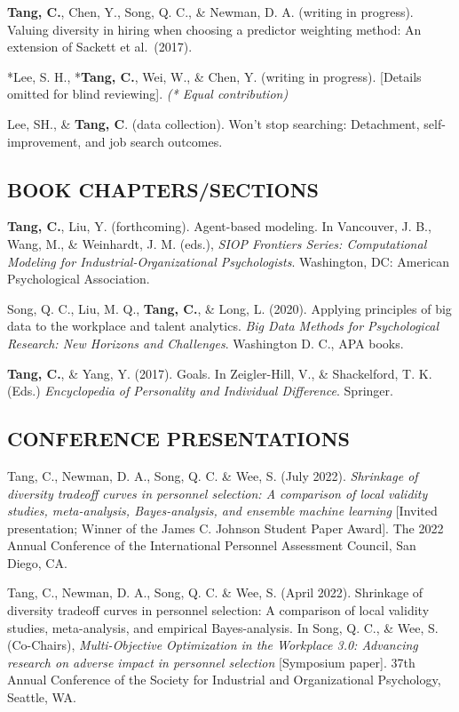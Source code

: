 \documentclass[
  20,
]{article}
\begin{document}
\textbf{Tang, C.}, Chen, Y., Song, Q. C., \& Newman, D. A. (writing in
progress). Valuing diversity in hiring when choosing a predictor
weighting method: An extension of Sackett et al.~(2017).

*Lee, S. H., *\textbf{Tang, C.}, Wei, W., \& Chen, Y. (writing in
progress). {[}Details omitted for blind reviewing{]}. \emph{(* Equal
contribution)}

Lee, SH., \& \textbf{Tang, C}. (data collection). Won't stop searching:
Detachment, self-improvement, and job search outcomes.

\hypertarget{book-chapterssections}{%
\subsection{\texorpdfstring{\textbf{BOOK
CHAPTERS/SECTIONS}}{BOOK CHAPTERS/SECTIONS}}\label{book-chapterssections}}

\textbf{Tang, C.}, Liu, Y. (forthcoming). Agent-based modeling. In
Vancouver, J. B., Wang, M., \& Weinhardt, J. M. (eds.), \emph{SIOP
Frontiers Series: Computational Modeling for Industrial-Organizational
Psychologists}. Washington, DC: American Psychological Association.

Song, Q. C., Liu, M. Q., \textbf{Tang, C.}, \& Long, L. (2020). Applying
principles of big data to the workplace and talent analytics. \emph{Big
Data Methods for Psychological Research: New Horizons and Challenges}.
Washington D. C., APA books.

\textbf{Tang, C.}, \& Yang, Y. (2017). Goals. In Zeigler-Hill, V., \&
Shackelford, T. K. (Eds.) \emph{Encyclopedia of Personality and
Individual Difference}. Springer.

\hypertarget{conference-presentations}{%
\subsection{\texorpdfstring{\textbf{CONFERENCE
PRESENTATIONS}}{CONFERENCE PRESENTATIONS}}\label{conference-presentations}}

Tang, C., Newman, D. A., Song, Q. C. \& Wee, S. (July 2022).
\emph{Shrinkage of diversity tradeoff curves in personnel selection: A
comparison of local validity studies, meta-analysis, Bayes-analysis, and
ensemble machine learning} {[}Invited presentation; Winner of the James
C. Johnson Student Paper Award{]}. The 2022 Annual Conference of the
International Personnel Assessment Council, San Diego, CA.

Tang, C., Newman, D. A., Song, Q. C. \& Wee, S. (April 2022). Shrinkage
of diversity tradeoff curves in personnel selection: A comparison of
local validity studies, meta-analysis, and empirical Bayes-analysis. In
Song, Q. C., \& Wee, S. (Co-Chairs), \emph{Multi-Objective Optimization
in the Workplace 3.0: Advancing research on adverse impact in personnel
selection} {[}Symposium paper{]}. 37th Annual Conference of the Society
for Industrial and Organizational Psychology, Seattle, WA.
\end{document}
